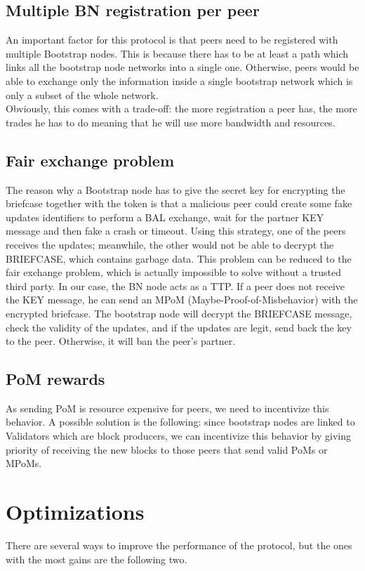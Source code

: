 \documentclass[mscthesis]{usiinfthesis}
\begin{document}
\subsection{Multiple BN registration per peer}
An important factor for this protocol is that peers need to be registered with multiple Bootstrap nodes. This is because there has to be at least a path which links all the bootstrap node networks into a single one. Otherwise, peers would be able to exchange only the information inside a single bootstrap network which is only a subset of the whole network. \\ 
Obviously, this comes with a trade-off: the more registration a peer has, the more trades he has to do meaning that he will use more bandwidth and resources.

\subsection{Fair exchange problem}
The reason why a Bootstrap node has to give the secret key for encrypting the briefcase together with the token is that a malicious peer could create some fake updates identifiers to perform a BAL exchange, wait for the partner KEY message and then fake a crash or timeout. Using this strategy, one of the peers receives the updates; meanwhile, the other would not be able to decrypt the BRIEFCASE, which contains garbage data. This problem can be reduced to the fair exchange problem, which is actually impossible to solve without a trusted third party. In our case, the BN node acts as a TTP. If a peer does not receive the KEY message, he can send an MPoM (Maybe-Proof-of-Misbehavior) with the encrypted briefcase. The bootstrap node will decrypt the BRIEFCASE message, check the validity of the updates, and if the updates are legit, send back the key to the peer. Otherwise, it will ban the peer's partner.

\subsection{PoM rewards}
As sending PoM is resource expensive for peers, we need to incentivize this behavior. A possible solution is the following: since bootstrap nodes are linked to Validators which are block producers, we can incentivize this behavior by giving priority of receiving the new blocks to those peers that send valid PoMs or MPoMs.

\section{Optimizations}
There are several ways to improve the performance of the protocol, but the ones with the most gains are the following two.
\end{document}
